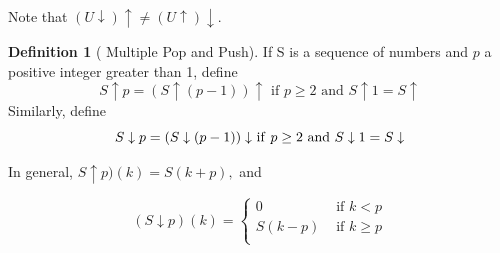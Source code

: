 \documentclass[10pt,]{book}
\theoremstyle{plain}
\theoremstyle{definition}
\newtheorem{definition}[theorem]{Definition}
\theoremstyle{definition}
\theoremstyle{definition}
\theoremstyle{definition}
\numberwithin{equation}{section}
\begin{document}
\par
Note that \((U\downarrow )\uparrow \neq (U\uparrow )\downarrow\).%
\begin{definition}[ Multiple Pop and Push]\label{def-multiple-pop-and-push}
\label{notation-10}
\label{notation-11}
If S is a sequence of numbers and \(p\) a positive integer greater than 1, define
\[S\uparrow p = (S\uparrow (p - 1))\uparrow\textrm{ if }p \geq  2 \textrm{ and }S\uparrow 1 = S\uparrow\] 
Similarly, define
\[S\downarrow p = (S\downarrow (p - 1))\downarrow\)\textrm{ if }\(p \geq  2\textrm{ and }S\downarrow 1 = S\downarrow\]
%
\end{definition}
\par
In general, \(S \uparrow p)(k) = S(k+p),\) and



\begin{equation*}
(S\downarrow p)(k)=\left\{
   \begin{array}{cc}
 0 & \textrm{ if } k < p \\
 S(k-p) & \textrm{ if } k\geq p \\
\end{array}

\end{equation*}
%
\typeout{************************************************}
\typeout{************************************************}
\end{document}
